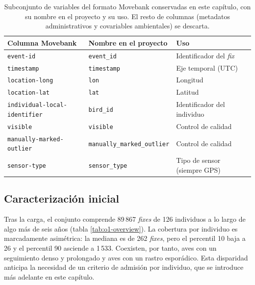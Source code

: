 \begin{table}[H]
  \centering
  \caption[Selección y renombrado de variables]{Subconjunto de variables del
  formato Movebank conservadas en este capítulo, con su nombre en el proyecto y su uso. El
  resto de columnas (metadatos administrativos y covariables ambientales) se
  descarta.}
  \label{tab:o1-variables}
  \begin{tabular}{lll}
    \toprule
    \textbf{Columna Movebank} & \textbf{Nombre en el proyecto} & \textbf{Uso} \\
    \midrule
    \texttt{event-id} & \texttt{event\_id} & Identificador del \textit{fix} \\
    \texttt{timestamp} & \texttt{timestamp} & Eje temporal (UTC) \\
    \texttt{location-long} & \texttt{lon} & Longitud \\
    \texttt{location-lat} & \texttt{lat} & Latitud \\
    \texttt{individual-local-identifier} & \texttt{bird\_id} & Identificador del individuo \\
    \texttt{visible} & \texttt{visible} & Control de calidad \\
    \texttt{manually-marked-outlier} & \texttt{manually\_marked\_outlier} & Control de calidad \\
    \texttt{sensor-type} & \texttt{sensor\_type} & Tipo de sensor (siempre GPS) \\
    \bottomrule
  \end{tabular}
\end{table}

\subsection{Caracterización inicial}
\label{sec:o1-caracterizacion}

Tras la carga, el conjunto comprende 89\,867 \textit{fixes} de 126 individuos a
lo largo de algo más de seis años (tabla \ref{tab:o1-overview}). La cobertura por
individuo es marcadamente asimétrica: la mediana es de 262 \textit{fixes}, pero el
percentil 10 baja a 26 y el percentil 90 asciende a 1\,533. Coexisten, por tanto,
aves con un seguimiento denso y prolongado y aves con un rastro esporádico. Esta
disparidad anticipa la necesidad de un criterio de admisión por individuo, que se
introduce más adelante en este capítulo.

